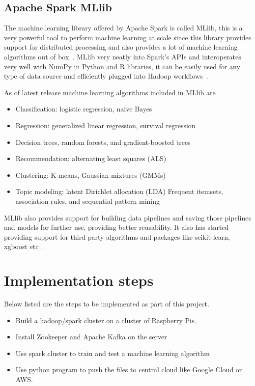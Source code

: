 \subsection{Apache Spark MLlib}

The machine learning library offered by Apache Spark is called MLlib,
this is a very powerful tool to perform machine learning at scale
since this library provides support for distributed processing and
also provides a lot of machine learning algorithms out of
box~\cite{hid-sp18-510-sparkml}. MLlib very neatly into Spark's APIs
and interoperates very well with NumPy in Python and R libraries, it
can be easily used for any type of data source and efficiently plugged
into Hadoop workflows~\cite{hid-sp18-510-apmllib}.

As of latest release machine learning algorithms included in MLlib are 
\begin{itemize}
\item Classification: logistic regression, naive Bayes
\item Regression: generalized linear regression, survival regression
\item Decision trees, random forests, and gradient-boosted trees
\item Recommendation: alternating least squares (ALS)
\item Clustering: K-means, Gaussian mixtures (GMMs)
\item Topic modeling: latent Dirichlet allocation (LDA)
Frequent itemsets, association rules, and sequential pattern mining
\end{itemize}

MLlib also provides support for building data pipelines and saving
those pipelines and models for further use, providing better
reusability. It also has started providing support for third party
algorithms and packages like scikit-learn, xgboost
etc~\cite{hid-sp18-510-mllib2}.

\section{Implementation steps}

Below listed are the steps to be implemented as part of this project.

\begin{itemize}
	\item Build a hadoop/spark cluster on a cluster of Raspberry Pis.
	\item Install Zookeeper and Apache Kafka on the server
	\item Use spark cluster to train and test a machine learning algorithm
	\item Use python program to push the files to central cloud like
    Google Cloud or AWS.
\end{itemize} 

